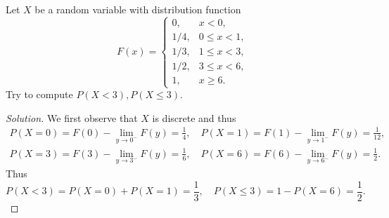 \documentclass[11pt,singlecolumn, openany, citestyle=authoryear]{elegantbook}
\begin{document}
\begin{CJK}{UTF8}{gbsn}


\begin{exercise}
    Let $X$ be a random variable with distribution function 
    $$
    F(x)=
    \begin{cases}
        0, & x< 0, \\
        1/4, &0\leqslant x < 1, \\
        1/3, & 1\leqslant x < 3, \\
        1/2, & 3\leqslant x < 6,\\
        1, & x\geqslant 6.
    \end{cases}
    $$
    Try to compute $P(X<3),P(X\leqslant 3)$.
\end{exercise}
\begin{proof}[Solution]
    We first observe that $X$ is discrete and thus
    \begin{gather*}
        P(X=0) = F(0)-\lim_{y\to 0^-}F(y)=\frac{1}{4},\quad 
        P(X=1)= F(1)-\lim_{y\to 1^-}F(y)=\frac{1}{12},\\
        P(X=3)= F(3)-\lim_{y\to 3^-}F(y)=\frac{1}{6},\quad
        P(X=6)= F(6)-\lim_{y\to 6^-}F(y)=\frac{1}{2}.
    \end{gather*}
    Thus 
    $$
    P(X<3)=P(X=0)+P(X=1)=\frac{1}{3},\quad 
    P(X\leqslant 3)=1-P(X=6)=\frac{1}{2}.
    $$
\end{proof}


\end{CJK}
\end{document}
